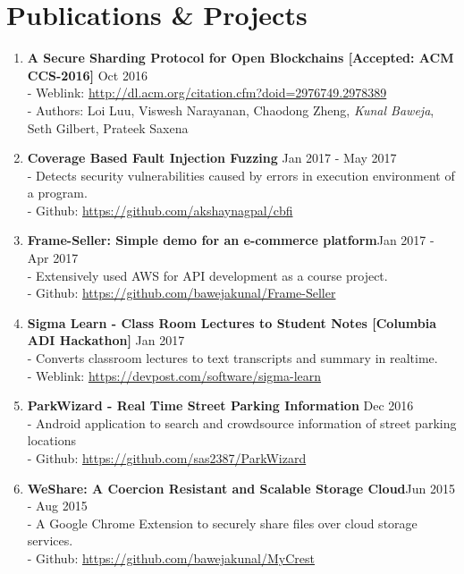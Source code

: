 \documentclass{article}
\begin{document}
\section*{Publications \& Projects}
\begin{enumerate}

    \item \textbf{A Secure Sharding Protocol for Open Blockchains [Accepted: ACM CCS-2016]} {\hfill Oct 2016}\\
    - Weblink: \href{http://dl.acm.org/citation.cfm?doid=2976749.2978389}{http://dl.acm.org/citation.cfm?doid=2976749.2978389}\\
    - Authors: Loi Luu, Viswesh Narayanan, Chaodong Zheng, \textit{Kunal Baweja}, Seth Gilbert, Prateek Saxena

    \item \textbf{Coverage Based Fault Injection Fuzzing} {\hfill Jan 2017 - May 2017}\\
    - Detects security vulnerabilities caused by errors in execution environment of a program.\\
    - Github: \href{https://github.com/akshaynagpal/cbfi}{https://github.com/akshaynagpal/cbfi}

    \item \textbf{Frame-Seller: Simple demo for an e-commerce platform}{\hfill Jan 2017 - Apr 2017}\\
    - Extensively used AWS for API development as a course project.\\
    - Github: \href{https://github.com/bawejakunal/Frame-Seller}{https://github.com/bawejakunal/Frame-Seller}

    \item \textbf{Sigma Learn - Class Room Lectures to Student Notes [Columbia ADI Hackathon]} {\hfill Jan 2017}\\
    - Converts classroom lectures to text transcripts and summary in realtime.\\
    - Weblink: \href{https://devpost.com/software/sigma-learn}{https://devpost.com/software/sigma-learn}

    \item \textbf{ParkWizard - Real Time Street Parking Information} {\hfill Dec 2016}\\
    - Android application to search and crowdsource information of street parking locations\\
    - Github: \href{https://github.com/sas2387/ParkWizard}{https://github.com/sas2387/ParkWizard}

    \item \textbf{WeShare: A Coercion Resistant and Scalable Storage Cloud}{\hfill Jun 2015 - Aug 2015}\\
    - A Google Chrome Extension to securely share files over cloud storage services.\\
    - Github: \href{https://github.com/bawejakunal/MyCrest}{https://github.com/bawejakunal/MyCrest}
    

\end{enumerate}
\end{document}
